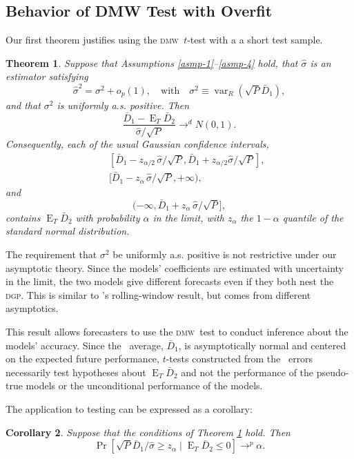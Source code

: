 \documentclass[11pt]{article}
\newtheorem{thm}{Theorem}[section]
\newtheorem{cor}[thm]{Corollary}
\DeclareMathOperator{\E}{E}
\DeclareMathOperator{\var}{var}
\newcommand{\citepos}[1]{\citeauthor{#1}'s \citeyearpar{#1}}
\newcommand{\dmw}{\textsc{dmw}}
\newcommand{\dgp}{\textsc{dgp}}
\begin{document}
\subsection{Behavior of DMW Test with Overfit}\label{sec:oostheory}
Our first theorem justifies using the \dmw\ $t$-test with a a short
test sample.

\begin{thm}\label{res-confidence-intervals}
  Suppose that Assumptions \ref{asmp-1}--\ref{asmp-4} hold, that
  $\hat\sigma$ is an estimator satisfying
  \[
    \hat\sigma^2 = \sigma^2 + o_p(1), \quad \text{with}\quad 
    \sigma^2 \equiv \var_R(\sqrt{P} \bar D_1),
  \]
  and that $\sigma^2$ is uniformly a.s. positive.  Then
  \[
  \frac{\bar{D}_1 - \E_T\bar{D}_2}{\hat\sigma / \sqrt{P}}
  \to^d N(0,1).
  \]
  Consequently, each of the usual Gaussian confidence intervals,
  \begin{eqnarray}
  &&[\bar{D}_1 - z_{\alpha/2} \, \hat\sigma /
      \sqrt{P}, \bar{D}_1 + z_{\alpha/2} \hat\sigma / \sqrt{P}],\label{interval-twosided} \\
  &&[\bar{D}_1 - z_{\alpha} \, \hat\sigma / \sqrt{P}, +\infty), \label{interval-greater}
  \end{eqnarray}
  and
  \begin{equation} (-\infty, \bar{D}_1 + z_{\alpha}
      \, \hat\sigma / \sqrt{P}],
  \end{equation}
  contains $\E_T\bar{D}_2$ with probability $\alpha$ in the limit,
  with $z_{\alpha}$ the $1-\alpha$ quantile of the standard normal
  distribution.
\end{thm}
The requirement that $\sigma^2$ be uniformly a.s. positive is
not restrictive under our asymptotic theory.  Since the models'
coefficients are estimated with uncertainty in the limit, the two
models give different forecasts even if they both nest the \dgp.  This
is similar to \citepos{giacomini_tests_2006} rolling-window result,
but comes from different asymptotics.

This result allows forecasters to use the \dmw\ test to conduct
inference about the models' accuracy.  Since the \oos\ average,
$\bar D_1$, is asymptotically normal and centered on the expected
future performance, $t$-tests constructed from the \oos\ errors
necessarily test hypotheses about $\E_T \bar{D}_2$ and not the
performance of the pseudo-true models or the unconditional
performance of the models.

The application to testing can be expressed as a corollary:
\begin{cor}\label{res:oostest}
Suppose that the conditions of Theorem \ref{res-confidence-intervals}
hold.  Then
\begin{equation}
  \Pr[\sqrt{P}\bar D_{1}/\hat\sigma \geq z_{\alpha} \mid \E_{T}
  \bar{D}_{2} \leq 0] \to^p \alpha.
\end{equation}
\end{cor}
\end{document}
